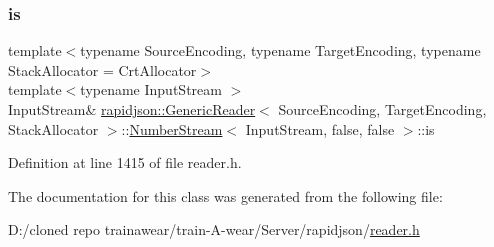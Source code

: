 \subsubsection{\texorpdfstring{is}{is}}
{\footnotesize\ttfamily template$<$typename Source\+Encoding, typename Target\+Encoding, typename Stack\+Allocator = Crt\+Allocator$>$ \\
template$<$typename Input\+Stream $>$ \\
Input\+Stream\& \mbox{\hyperlink{classrapidjson_1_1_generic_reader}{rapidjson\+::\+Generic\+Reader}}$<$ Source\+Encoding, Target\+Encoding, Stack\+Allocator $>$\+::\mbox{\hyperlink{classrapidjson_1_1_generic_reader_1_1_number_stream}{Number\+Stream}}$<$ Input\+Stream, false, false $>$\+::is\hspace{0.3cm}{\ttfamily [protected]}}



Definition at line 1415 of file reader.\+h.



The documentation for this class was generated from the following file\+:\begin{DoxyCompactItemize}
\item 
D\+:/cloned repo trainawear/train-\/\+A-\/wear/\+Server/rapidjson/\mbox{\hyperlink{reader_8h}{reader.\+h}}\end{DoxyCompactItemize}
